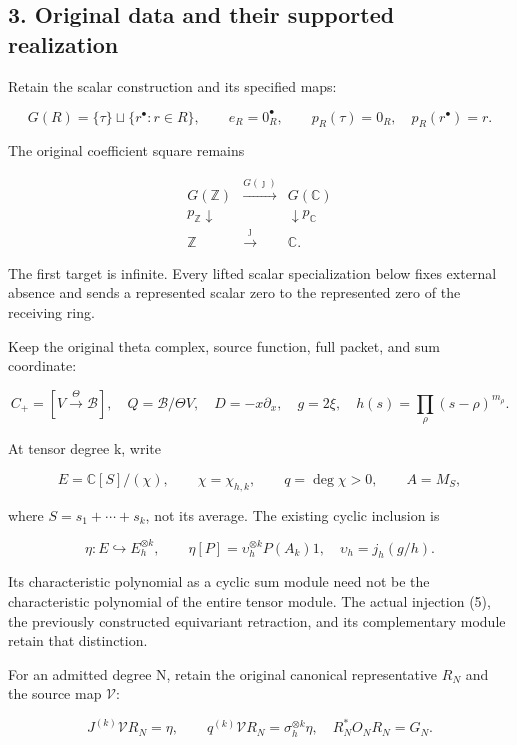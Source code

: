 \documentclass[
  11pt,
]{article}
\begin{document}
\subsection{3. Original data and their supported
realization}\label{original-data-and-their-supported-realization}

Retain the scalar construction and its specified maps:

\[
G(R)=\{\tau\}\sqcup\{r^\bullet:r\in R\},\qquad e_R=0_R^\bullet,
\qquad p_R(\tau)=0_R,\quad p_R(r^\bullet)=r.
\tag{1}
\]

The original coefficient square remains

\[
\begin{array}{ccc}
G(\mathbb Z)&\xrightarrow{G(\jmath)}&G(\mathbb C)\\
p_{\mathbb Z}\downarrow&&\downarrow p_{\mathbb C}\\
\mathbb Z&\xrightarrow{\jmath}&\mathbb C.
\end{array}
\tag{2}
\]

The first target is infinite. Every lifted scalar specialization below
fixes external absence and sends a represented scalar zero to the
represented zero of the receiving ring.

Keep the original theta complex, source function, full packet, and sum
coordinate:

\[
C_+=[V\xrightarrow{\Theta}\mathscr B],\quad
Q=\mathscr B/\Theta V,\quad D=-x\partial_x,\quad g=2\xi,
\quad h(s)=\prod_\rho(s-\rho)^{m_\rho}.
\tag{3}
\]

At tensor degree k, write

\[
E=\mathbb C[S]/(\chi),\qquad \chi=\chi_{h,k},\qquad q=\deg\chi>0,
\qquad A=M_S,
\tag{4}
\]

where \(S=s_1+\cdots+s_k\), not its average. The existing cyclic
inclusion is

\[
\eta:E\hookrightarrow E_h^{\otimes k},\qquad
\eta[P]=\upsilon_h^{\otimes k}P(A_k)1,
\quad \upsilon_h=j_h(g/h).
\tag{5}
\]

Its characteristic polynomial as a cyclic sum module need not be the
characteristic polynomial of the entire tensor module. The actual
injection (5), the previously constructed equivariant retraction, and
its complementary module retain that distinction.

For an admitted degree N, retain the original canonical representative
\(R_N\) and the source map \(\mathcal V\):

\[
J^{(k)}\mathcal V R_N=\eta,\qquad
q^{(k)}\mathcal V R_N=\sigma_h^{\otimes k}\eta,
\quad R_N^*O_NR_N=G_N.
\tag{6}
\]
\end{document}
